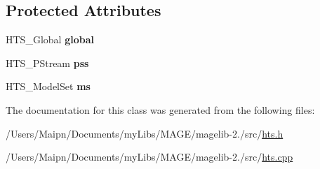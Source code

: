 \subsection*{Protected Attributes}
\begin{DoxyCompactItemize}
\item 
\hypertarget{class_m_a_g_e_1_1_engine_a384e050ced9ebccc4bf37d8c6051900f}{H\-T\-S\-\_\-\-Global {\bfseries global}}\label{class_m_a_g_e_1_1_engine_a384e050ced9ebccc4bf37d8c6051900f}

\item 
\hypertarget{class_m_a_g_e_1_1_engine_a76b2f51be6691017e93b45c2187f8fa5}{H\-T\-S\-\_\-\-P\-Stream {\bfseries pss}}\label{class_m_a_g_e_1_1_engine_a76b2f51be6691017e93b45c2187f8fa5}

\item 
\hypertarget{class_m_a_g_e_1_1_engine_ad26bf0e3d9eeebcdb9917a4f48971fa2}{H\-T\-S\-\_\-\-Model\-Set {\bfseries ms}}\label{class_m_a_g_e_1_1_engine_ad26bf0e3d9eeebcdb9917a4f48971fa2}

\end{DoxyCompactItemize}


The documentation for this class was generated from the following files\-:\begin{DoxyCompactItemize}
\item 
/\-Users/\-Maipn/\-Documents/my\-Libs/\-M\-A\-G\-E/magelib-\/2./src/\hyperlink{hts_8h}{hts.\-h}\item 
/\-Users/\-Maipn/\-Documents/my\-Libs/\-M\-A\-G\-E/magelib-\/2./src/\hyperlink{hts_8cpp}{hts.\-cpp}\end{DoxyCompactItemize}
